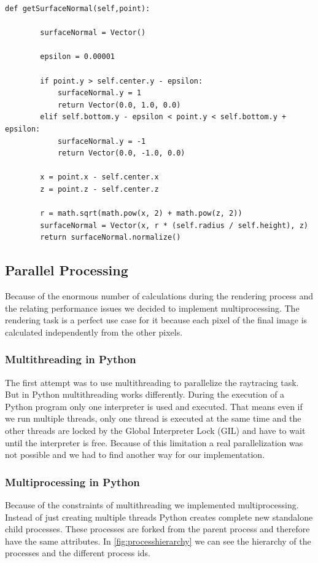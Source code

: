 \documentclass[10pt]{scrartcl}
\begin{document}
\begin{lstlisting}
def getSurfaceNormal(self,point):

        surfaceNormal = Vector()

        epsilon = 0.00001

        if point.y > self.center.y - epsilon:
            surfaceNormal.y = 1
            return Vector(0.0, 1.0, 0.0)
        elif self.bottom.y - epsilon < point.y < self.bottom.y + epsilon:
            surfaceNormal.y = -1
            return Vector(0.0, -1.0, 0.0)

        x = point.x - self.center.x
        z = point.z - self.center.z

        r = math.sqrt(math.pow(x, 2) + math.pow(z, 2))
        surfaceNormal = Vector(x, r * (self.radius / self.height), z)
        return surfaceNormal.normalize()
\end{lstlisting}

\subsection{Parallel Processing}

Because of the enormous number of calculations during the rendering process and the relating performance issues we decided to implement multiprocessing. The rendering task is a perfect use case for it because each pixel of the final image is calculated independently from the other pixels. 

\subsubsection{Multithreading in Python}

The first attempt was to use multithreading to parallelize the raytracing task. But in Python multithreading works differently. During the execution of a Python program only one interpreter is used and executed. That means even if we run multiple threads, only one thread is executed at the same time and the other threads are locked by the Global Interpreter Lock (GIL) and have to wait until the interpreter is free. Because of this limitation a real parallelization was not possible and we had to find another way for our implementation. 

\subsubsection{Multiprocessing in Python}

Because of the constraints of multithreading we implemented multiprocessing. Instead of just creating multiple threads Python creates complete new standalone child processes. These processes are forked from the parent process and therefore have the same attributes. In \ref{fig:processhierarchy} we can see the hierarchy of the processes and the different process ids. 
\end{document}
